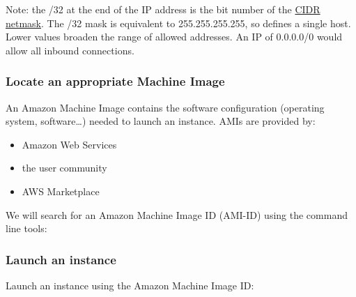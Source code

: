 Note: the /32 at the end of the IP address is the bit number of the
\href{http://en.wikipedia.org/wiki/Classless_Inter-Domain_Routing}{CIDR
netmask}. The /32 mask is equivalent to 255.255.255.255, so defines a
single host. Lower values broaden the range of allowed addresses. An IP
of 0.0.0.0/0 would allow all inbound connections.

\subsubsection{Locate an appropriate Machine
Image}\label{locate-an-appropriate-machine-image}

An Amazon Machine Image contains the software configuration (operating
system, software\ldots{}) needed to launch an instance. AMIs are
provided by:

\begin{itemize}
\itemsep1pt\parskip0pt
\item
  Amazon Web Services
\item
  the user community
\item
  AWS Marketplace
\end{itemize}

We will search for an Amazon Machine Image ID (AMI-ID) using the command
line tools:

\begin{Shaded}
\begin{Highlighting}[]
\NormalTok{$ } 
   
\end{Highlighting}
\end{Shaded}

\subsubsection{Launch an instance}\label{launch-an-instance}

Launch an instance using the Amazon Machine Image ID:

\begin{Shaded}
\begin{Highlighting}[]
\NormalTok{$ } \KeywordTok{<}\KeywordTok{>} \NormalTok{\textbackslash{}}
   \KeywordTok{<}\KeywordTok{>} \NormalTok{\textbackslash{}}
   
   \KeywordTok{<}\KeywordTok{>}
\end{Highlighting}
\end{Shaded}

